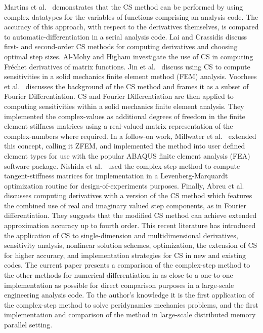 \documentclass[preprint,12pt]{elsarticle}
\begin{document}
Martins et al.\ \cite{martins2003complex} demonstrates that the CS method can be performed by using complex datatypes for the variables of functions comprising an analysis code. The accuracy of this approach, with respect to the derivatives themselves, is compared to automatic-differentiation in a serial analysis code. Lai and Crassidis \cite{lai2008extensions} discuss first- and second-order CS methods for computing derivatives and choosing optimal step sizes.  Al-Mohy and Higham \cite{al2010complex} investigate the use of CS in computing Fr\'{e}chet derivatives of matrix functions. Jin et al.\ \cite{jin2010improved} discuss using CS to compute sensitivities in a solid mechanics finite element method (FEM) analysis.  Voorhees et al.\ \cite{voorhees2011complex} discusses the background of the CS method and frames it as a subset of Fourier Differentiation. CS and Fourier Differentiation are then applied to computing sensitivities within a solid mechanics finite element analysis. They implemented the complex-values as additional degrees of freedom in the finite element stiffness matrices using a real-valued matrix representation of the complex-numbers where required. In a follow-on work,  Millwater et al.\  \cite{millwater2013application} extended this concept, calling it ZFEM, and implemented the method into user defined element types for use with the popular ABAQUS \cite{systemes2012abaqus} finite element analysis (FEA) software package.  Nishida et al.\ \cite{nishida2013} used the complex-step method to compute tangent-stiffness matrices for implementation in a Levenberg-Marquardt optimization routine for design-of-experiments purposes.  Finally, Abreu et al.\ \cite{abreu2013generalization} discusses computing derivatives with a version of the CS method which features the combined use of real and imaginary valued step components, as in Fourier differentiation.  They suggests that the modified CS method can achieve extended approximation accuracy up to fourth order.  This recent literature has introduced the application of CS to single-dimension and multidimensional derivatives, sensitivity analysis, nonlinear solution schemes, optimization, the extension of CS for higher accuracy, and implementation strategies for CS in new and existing codes.  The current paper presents a comparison of the complex-step method to the other methods for numerical differentiation in as close to a one-to-one implementation as possible for direct comparison purposes in a large-scale engineering analysis code. To the author's knowledge it is the first application of the complex-step method to solve peridynamics mechanics problems, and the first implementation and comparison of the method in large-scale distributed memory parallel setting. 
\end{document}
